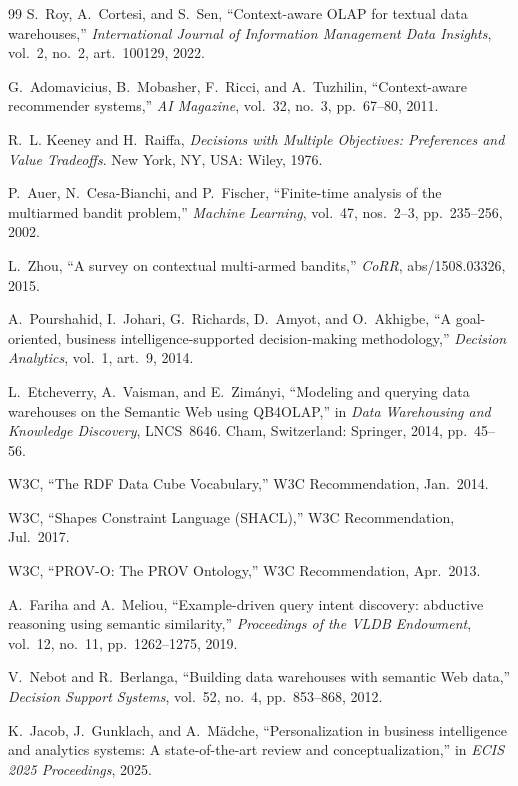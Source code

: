 \documentclass[journal]{IEEEtran}
\begin{document}
\begin{thebibliography}{99}
S.~Roy, A.~Cortesi, and S.~Sen, ``Context-aware OLAP for textual data warehouses,'' \emph{International Journal of Information Management Data Insights}, vol.~2, no.~2, art.~100129, 2022.

G.~Adomavicius, B.~Mobasher, F.~Ricci, and A.~Tuzhilin, ``Context-aware recommender systems,'' \emph{AI Magazine}, vol.~32, no.~3, pp.~67--80, 2011.

R.~L. Keeney and H.~Raiffa, \emph{Decisions with Multiple Objectives: Preferences and Value Tradeoffs}. New York, NY, USA: Wiley, 1976.

P.~Auer, N.~Cesa-Bianchi, and P.~Fischer, ``Finite-time analysis of the multiarmed bandit problem,'' \emph{Machine Learning}, vol.~47, nos.~2--3, pp.~235--256, 2002.

L.~Zhou, ``A survey on contextual multi-armed bandits,'' \emph{CoRR}, abs/1508.03326, 2015.

A.~Pourshahid, I.~Johari, G.~Richards, D.~Amyot, and O.~Akhigbe, ``A goal-oriented, business intelligence-supported decision-making methodology,'' \emph{Decision Analytics}, vol.~1, art.~9, 2014.

L.~Etcheverry, A.~Vaisman, and E.~Zim\'anyi, ``Modeling and querying data warehouses on the Semantic Web using QB4OLAP,'' in \emph{Data Warehousing and Knowledge Discovery}, LNCS~8646. Cham, Switzerland: Springer, 2014, pp.~45--56.

W3C, ``The RDF Data Cube Vocabulary,'' W3C Recommendation, Jan.~2014.

W3C, ``Shapes Constraint Language (SHACL),'' W3C Recommendation, Jul.~2017.

W3C, ``PROV-O: The PROV Ontology,'' W3C Recommendation, Apr.~2013.

A.~Fariha and A.~Meliou, ``Example-driven query intent discovery: abductive reasoning using semantic similarity,'' \emph{Proceedings of the VLDB Endowment}, vol.~12, no.~11, pp.~1262--1275, 2019.

V.~Nebot and R.~Berlanga, ``Building data warehouses with semantic Web data,'' \emph{Decision Support Systems}, vol.~52, no.~4, pp.~853--868, 2012.


K.~Jacob, J.~Gunklach, and A.~M\"adche, ``Personalization in business intelligence and analytics systems: A state-of-the-art review and conceptualization,'' in \emph{ECIS 2025 Proceedings}, 2025.


\end{thebibliography}
\end{document}
